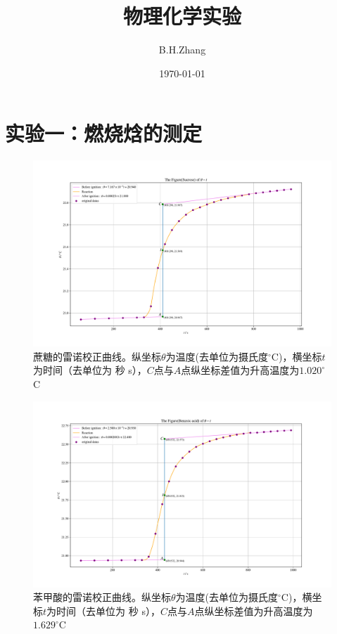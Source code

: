 \documentclass[UTF8,AutoFakeBold,a4paper]{article}
\title{\textbf{物理化学实验}}
\date{\today}
\author{B.H.Zhang}
\begin{document}
	\maketitle
	\section{实验一：燃烧焓的测定}
	\begin{figure}[h]
	\centering
	\includegraphics[scale=0.4]{Fig1}
	\caption{蔗糖的雷诺校正曲线。纵坐标$\theta$为温度(去单位为摄氏度$^{\circ}$C)，横坐标$t$为时间（去单位为 秒 s），$C$点与$A$点纵坐标差值为升高温度为$1.020^{\circ}$C}
	\label{fi6}
\end{figure}
\newpage
	\begin{figure}[h]
	\centering
	\includegraphics[scale=0.4]{Fig2}
	\caption{苯甲酸的雷诺校正曲线。纵坐标$\theta$为温度(去单位为摄氏度$^{\circ}$C)，横坐标$t$为时间（去单位为 秒 s），$C$点与$A$点纵坐标差值为升高温度为$1.629^{\circ}$C}
	\label{fi8}
\end{figure}
\end{document}
